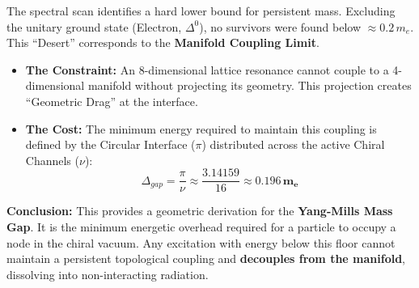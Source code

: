 The spectral scan identifies a hard lower bound for persistent mass. Excluding the unitary ground state (Electron, $\Delta^0$), no survivors were found below $\approx 0.2 \, m_e$. This ``Desert'' corresponds to the \textbf{Manifold Coupling Limit}.

\begin{itemize}
    \item \textbf{The Constraint:} An 8-dimensional lattice resonance cannot couple to a 4-dimensional manifold without projecting its geometry. This projection creates ``Geometric Drag'' at the interface.
    \item \textbf{The Cost:} The minimum energy required to maintain this coupling is defined by the Circular Interface ($\pi$) distributed across the active Chiral Channels ($\nu$):
    \[ \Delta_{gap} = \frac{\pi}{\nu} \approx \frac{3.14159}{16} \approx \mathbf{0.196 \, m_e} \]
\end{itemize}

\textbf{Conclusion:} This provides a geometric derivation for the \textbf{Yang-Mills Mass Gap}. It is the minimum energetic overhead required for a particle to occupy a node in the chiral vacuum. Any excitation with energy below this floor cannot maintain a persistent topological coupling and \textbf{decouples from the manifold}, dissolving into non-interacting radiation.